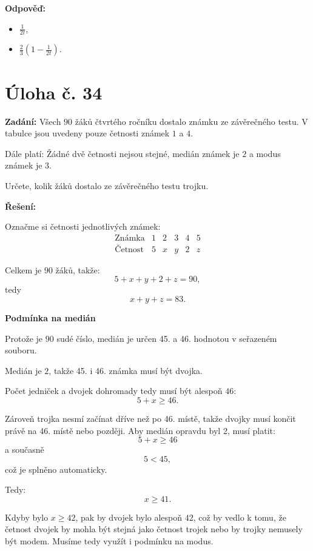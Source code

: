 \documentclass[12pt,a4paper]{article}
\begin{document}
\bigskip

\textbf{Odpověď:}
\begin{itemize}
    \item[3.1] \(\frac{1}{2t}\),
    \item[3.2] \(\frac{2}{3}\left(1-\frac{1}{2t}\right)\).
\end{itemize}



\newpage
\section*{Úloha č. 34}

\textbf{Zadání:}  
Všech \(90\) žáků čtvrtého ročníku dostalo známku ze závěrečného testu.  
V tabulce jsou uvedeny pouze četnosti známek \(1\) a \(4\).

Dále platí: Žádné dvě četnosti nejsou stejné, medián známek je \(2\) a modus známek je \(3\).

Určete, kolik žáků dostalo ze závěrečného testu trojku.

\bigskip

\textbf{Řešení:}

Označme si četnosti jednotlivých známek:
\[
\begin{array}{c|ccccc}
\text{Známka} & 1 & 2 & 3 & 4 & 5 \\
\hline
\text{Četnost} & 5 & x & y & 2 & z
\end{array}
\]

Celkem je \(90\) žáků, takže:
\[
5+x+y+2+z=90,
\]
tedy
\[
x+y+z=83.
\]

\medskip

\textbf{Podmínka na medián}

Protože je \(90\) sudé číslo, medián je určen 45. a 46. hodnotou v seřazeném souboru.

Medián je \(2\), takže 45. i 46. známka musí být dvojka.

Počet jedniček a dvojek dohromady tedy musí být alespoň \(46\):
\[
5+x \ge 46.
\]

Zároveň trojka nesmí začínat dříve než po 46. místě, takže dvojky musí končit právě na 46. místě nebo později. Aby medián opravdu byl 2, musí platit:
\[
5+x \ge 46
\]
a současně
\[
5 < 45,
\]
což je splněno automaticky.

Tedy:
\[
x \ge 41.
\]

Kdyby bylo \(x \ge 42\), pak by dvojek bylo alespoň \(42\), což by vedlo k tomu, že četnost dvojek by mohla být stejná jako četnost trojek nebo by trojky nemusely být modem. Musíme tedy využít i podmínku na modus.
\end{document}
